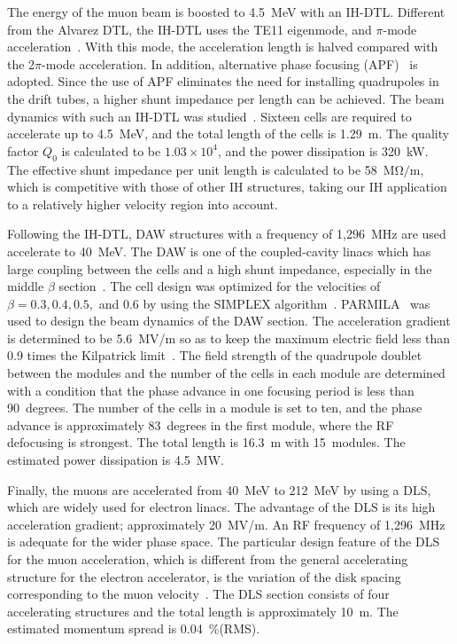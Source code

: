 \newcommand{\Ez}{E_{z}}

The energy of the muon beam is boosted to 4.5~MeV with an IH-DTL.
Different from the Alvarez DTL, the IH-DTL uses the TE11 eigenmode,
and $\pi$-mode acceleration~\cite{bib:IH_blewette}. 
With this mode, the acceleration length is halved compared with
the 2$\pi$-mode acceleration. 
In addition, alternative phase focusing (APF)~\cite{bib:IH_APF1} is adopted.
Since the use of APF eliminates the need for installing quadrupoles
in the drift tubes, a higher shunt impedance per length can be achieved. 
The beam dynamics with such an IH-DTL was studied~\cite{Otani:2016swo}.
Sixteen cells are required to accelerate up to 4.5~MeV,
and the total length of the cells is 1.29~m. 
The quality factor $Q_{0}$ is calculated to be $1.03\times 10^{4}$, 
and the power dissipation is 320~kW. 
The effective shunt impedance per unit length is calculated
to be 58~$\mathrm{M\Omega/m}$,
which is competitive with those of other IH structures, taking 
our IH application to a relatively higher velocity region into account. 


Following the IH-DTL, DAW structures
with a frequency of 1,296~MHz are used accelerate to 40~MeV.
The DAW is one of the coupled-cavity linacs which has large coupling 
between the cells and a high shunt impedance, especially in the middle
$\beta$ section~\cite{andreev:he_proton_linac_structures:linac1972}. 
The cell design was optimized for the velocities of 
$\beta=0.3, 0.4, 0.5,$ and $0.6$ 
by using the SIMPLEX algorithm~\cite{otani:develop_mulinac:ipac2016}.
PARMILA~\cite{parmila} was used to design
the beam dynamics of the DAW section.
The acceleration gradient is determined to be 5.6~MV/m so as to keep
the maximum electric field less than 0.9 times the Kilpatrick
limit~\cite{bib:kilpatrick}. 
The field strength of the quadrupole doublet between the modules and
the number of the cells in each module are determined
with a condition that the phase advance in one focusing period
is less than 90~degrees. 
The number of the cells in a module is set to ten, and  
the phase advance is approximately 83~degrees in the first module,
where the RF defocusing is strongest. 
The total length is 16.3~m with 15~modules.
The estimated power dissipation is 4.5~MW. 


 Finally, the muons are accelerated from 40~MeV to 212~MeV by using a DLS,
which are widely used for electron linacs.
 The advantage of the DLS is its high acceleration gradient;
approximately 20~MV/m.
 An RF frequency of 1,296~MHz is adequate for the wider phase space.
The particular design feature of the DLS for
the muon acceleration, which is different from 
the general accelerating structure for the electron accelerator, 
is the variation of the disk spacing corresponding to 
the muon velocity~\cite{kondo:beamdynamics_muon_highbeta:ipac2017}.
 The DLS section consists of four accelerating structures and 
the total length is approximately 10~m.
The estimated momentum spread is 
0.04~\%(RMS).

